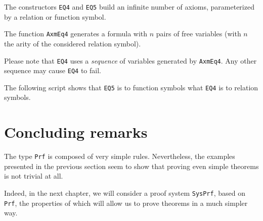 The constructors \texttt{EQ4}  and \texttt{EQ5} build an infinite number of axioms, parameterized by a  relation  or function symbol.

The function \texttt{AxmEq4} generates a formula with $n$ pairs of free variables (with $n$ the arity of the considered relation symbol).


Please note that \texttt{EQ4} uses a \emph{sequence} of variables generated by \texttt{AxmEq4}. Any other sequence may cause 
\texttt{EQ4} to fail.


The following script shows that \texttt{EQ5} is to function symbols 
what \texttt{EQ4} is to relation symbols.





\section{Concluding remarks}

The type \texttt{Prf} is composed of very simple rules.
Nevertheless, the examples presented in the previous section seem to show that proving even simple theorems is not trivial at all.


Indeed, in the next chapter, we will consider a proof system
\texttt{SysPrf}, based on \texttt{Prf}, the properties of which will 
allow us to prove theorems in a much simpler way.











